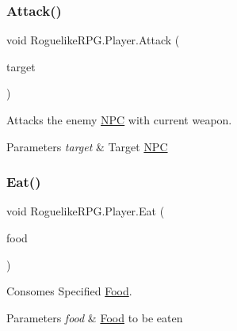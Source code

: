 \subsubsection{\texorpdfstring{Attack()}{Attack()}}
{\footnotesize\ttfamily void Roguelike\+R\+P\+G.\+Player.\+Attack (\begin{DoxyParamCaption}\item[{\mbox{\hyperlink{class_roguelike_r_p_g_1_1_n_p_c}{N\+PC}}}]{target }\end{DoxyParamCaption})\hspace{0.3cm}{\ttfamily [inline]}}



Attacks the enemy \mbox{\hyperlink{class_roguelike_r_p_g_1_1_n_p_c}{N\+PC}} with current weapon. 


\begin{DoxyParams}{Parameters}
{\em target} & Target \mbox{\hyperlink{class_roguelike_r_p_g_1_1_n_p_c}{N\+PC}}\\
\hline
\end{DoxyParams}
\mbox{\label{class_roguelike_r_p_g_1_1_player_ae8cdb59fd33dbc6f1b8cc3c17f15908e}} 
\subsubsection{\texorpdfstring{Eat()}{Eat()}}
{\footnotesize\ttfamily void Roguelike\+R\+P\+G.\+Player.\+Eat (\begin{DoxyParamCaption}\item[{\mbox{\hyperlink{class_roguelike_r_p_g_1_1_food}{Food}}}]{food }\end{DoxyParamCaption})\hspace{0.3cm}{\ttfamily [inline]}}



Consomes Specified \mbox{\hyperlink{class_roguelike_r_p_g_1_1_food}{Food}}. 


\begin{DoxyParams}{Parameters}
{\em food} & \mbox{\hyperlink{class_roguelike_r_p_g_1_1_food}{Food}} to be eaten\\
\hline
\end{DoxyParams}
\mbox{\label{class_roguelike_r_p_g_1_1_player_a9851fb6d029e554484fc11bb345b1632}} 
